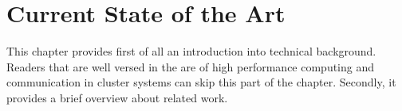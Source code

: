 \chapter{Current State of the Art}
\label{sec:state}







This chapter provides first of all an introduction into technical
background. Readers that are well versed in the are of high performance
computing and communication in cluster systems can skip this part of
the chapter. Secondly, it provides a brief overview about
related work.

